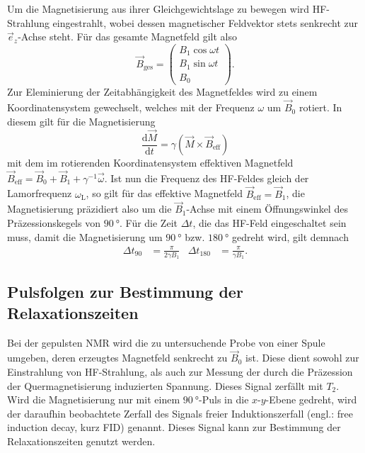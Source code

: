 Um die Magnetisierung aus ihrer Gleichgewichtslage zu bewegen wird HF-Strahlung eingestrahlt, wobei dessen magnetischer Feldvektor stets senkrecht zur $\vec{e}_z$-Achse steht. Für das gesamte Magnetfeld gilt also
\begin{equation*}
  \vec{B}_\mathrm{ges} = \begin{pmatrix} B_1 \cos \omega t \\ B_1 \sin \omega t \\ B_0 \end{pmatrix}.
\end{equation*}
Zur Eleminierung der Zeitabhängigkeit des Magnetfeldes wird zu einem Koordinatensystem gewechselt, welches mit der Frequenz $\omega$ um $\vec{B}_0$ rotiert. In diesem gilt für die Magnetisierung
\begin{equation*}
  \frac{\mathrm{d}\vec{M}}{\mathrm{d}t} = \gamma \left( \vec{M} \times \vec{B}_\mathrm{eff} \right)
\end{equation*}
mit dem im rotierenden Koordinatensystem effektiven Magnetfeld $\vec{B}_\mathrm{eff} = \vec{B}_0 + \vec{B}_1 + \gamma^{-1} \vec{\omega}$.
Ist nun die Frequenz des HF-Feldes gleich der Lamorfrequenz $\omega_\mathrm{L}$, so gilt für das effektive Magnetfeld $\vec{B}_\mathrm{eff} = \vec{B}_1$, die Magnetisierung präzidiert also um die $\vec{B}_1$-Achse mit einem Öffnungswinkel des Präzessionskegels von $\SI{90}{\degree}$. Für die Zeit $\Delta t$, die das HF-Feld eingeschaltet sein muss, damit die Magnetisierung um $\SI{90}{\degree}$ bzw. $\SI{180}{\degree}$ gedreht wird, gilt demnach
\begin{align*}
  \Delta t_{90} &= \frac{\pi}{2 \gamma B_1} & \Delta t_{180} &= \frac{\pi}{\gamma B_1}.
\end{align*}


\subsection{Pulsfolgen zur Bestimmung der Relaxationszeiten}
Bei der gepulsten NMR wird die zu untersuchende Probe von einer Spule umgeben, deren erzeugtes Magnetfeld senkrecht zu $\vec{B}_0$ ist. Diese dient sowohl zur Einstrahlung von HF-Strahlung, als auch zur Messung der durch die Präzession der Quermagnetisierung induzierten Spannung. Dieses Signal zerfällt mit $T_2$. Wird die Magnetisierung nur mit einem $\SI{90}{\degree}$-Puls in die $x$-$y$-Ebene gedreht, wird der daraufhin beobachtete Zerfall des Signals freier Induktionszerfall (engl.: free induction decay, kurz FID) genannt. Dieses Signal kann zur Bestimmung der Relaxationszeiten genutzt werden.


